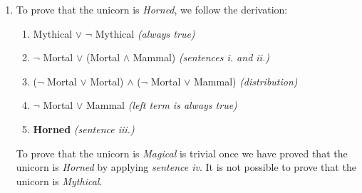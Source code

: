 \documentclass[12pt]{article}
\begin{document}
\begin{enumerate}
\begin{enumerate}
		\item To prove that the unicorn is \textit{Horned}, we follow the derivation:
		\begin{enumerate}
			\item Mythical $\lor$ $\neg$ Mythical \textit{(always true)}
			\item $\neg$ Mortal $\lor$ (Mortal $\land$ Mammal) \textit{(sentences i. and ii.)}
			\item ($\neg$ Mortal $\lor$ Mortal) $\land$ ($\neg$ Mortal $\lor$ Mammal) \textit{(distribution)}
			\item $\neg$ Mortal $\lor$ Mammal \textit{(left term is always true)}
			\item \textbf{Horned} \textit{(sentence iii.)}
		\end{enumerate}
		To prove that the unicorn is \textit{Magical} is trivial once we have proved that the unicorn is \textit{Horned} by applying \textit{sentence iv}. It is not possible to prove that the unicorn is \textit{Mythical}.
	\end{enumerate}
	
	
		
\end{enumerate}
\end{document}
